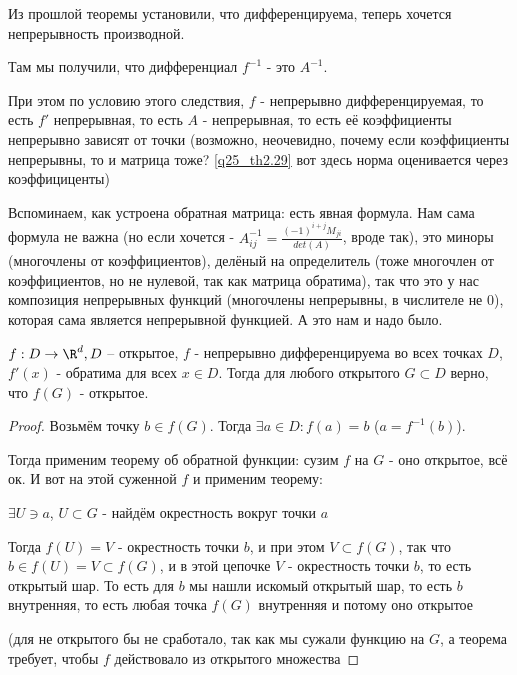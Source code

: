     \begin{consequence}

        \thmslashn

        Из прошлой теоремы установили, что дифференцируема, теперь хочется непрерывность производной.

        Там мы получили, что дифференциал $f^{-1}$ - это $A^{-1}$. 

        При этом по условию этого следствия, $f$ - непрерывно дифференцируемая, то есть $f'$ непрерывная, то есть $A$ - непрерывная, то есть её коэффициенты непрерывно зависят от точки (возможно, неочевидно, почему если коэффициенты непрерывны, то и матрица тоже? \ref{q25_th2.29} вот здесь норма оценивается через коэффициценты)

        Вспоминаем, как устроена обратная матрица: есть явная формула. Нам сама формула не важна (но если хочется - $A_{ij}^{-1} = \frac{(-1)^{i+j} M_{ji}}{det(A)}$, вроде так), это миноры (многочлены от коэффициентов), делёный на определитель (тоже многочлен от коэффициентов, но не нулевой, так как матрица обратима), так что это у нас композиция непрерывных функций (многочлены непрерывны, в числителе не 0), которая сама является непрерывной функцией. А это нам и надо было.
    \end{consequence}

    \begin{consequence}

        $f: D \to \R^d, D$ -- открытое, $f$ - непрерывно дифференцируема во всех точках $D$, $f'(x)$ - обратима для всех $x \in D$. Тогда для любого открытого $G \subset D$ верно, что $f(G)$ - открытое.
    \end{consequence}

    \begin{proof} \thmslashn

        Возьмём точку $b \in f(G)$. Тогда $\exists a \in D: f(a) = b$ ($a = f^{-1}(b)$). 

        Тогда применим теорему об обратной функции: сузим $f$ на $G$ - оно открытое, всё ок. И вот на этой суженной $f$ и применим теорему: 

        $\exists U \ni a$, $U \subset G$ - найдём окрестность вокруг точки $a$

        Тогда $f(U) = V$ - окрестность точки $b$, и при этом $V \subset f(G)$, так что $b \in f(U) = V \subset f(G)$, и в этой цепочке $V$ - окрестность точки $b$, то есть открытый шар. То есть для $b$ мы нашли искомый открытый шар, то есть $b$ внутренняя, то есть любая точка $f(G)$ внутренняя и потому оно открытое

        (для не открытого бы не сработало, так как мы сужали функцию на $G$, а теорема требует, чтобы $f$ действовало из открытого множества
    \end{proof}

